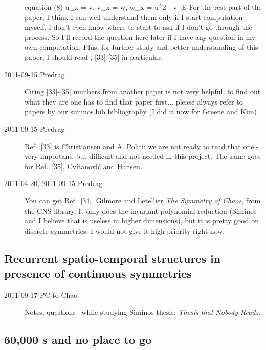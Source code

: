 \begin{description}
equation (8)
\beq u_x = v, v_x = w, w_x = u^2 - v -E
\eeq
For the rest part of the paper, I think I can well understand them only
if I start computation myself. I don't even know where to start to ask if
I don't go through the process. So I'll record the question here later if
I have any question in my own computation.
Plus, for further study and better understanding of this paper, I should
read , [33]-[35] in particular.

\item[2011-09-15 Predrag] Citing [33]-[35] numbers from another paper is not
very helpful, to find out what they are one has to find that paper first...
please always refer to papers by our siminos.bib bibliography (I did it now
for Greene and Kim)


\item[2011-09-15 Predrag] Ref.~[33] is Christiansen and A. Politi:
we are not ready to read that one -
very important, but difficult and not needed in this project. The same
goes for Ref.~[35], Cvitanovi\'{c} and Hansen.

\item[2011-04-20, 2011-09-15 Predrag] You can get Ref.~[34],
Gilmore and Letellier
{\em The Symmetry of Chaos}, from the CNS library. It only does the
invariant polynomial reduction (Siminos and I believe that is useless in
higher dimensions), but it is pretty good on discrete symmetries.
I would not give it high priority right now.

\end{description}


\subsection{Recurrent spatio-temporal structures
       in presence of continuous symmetries}
\label{s:SiminosThesis}

\begin{description}

\item[2011-09-17 PC to Chao]
Notes, questions \etc\ while studying Siminos thesis:
\emph{
           {Thesis that Nobody Reads}}.


\end{description}


\subsection{60,000 \rpo s and no place to go}
\label{s:SCD07}

